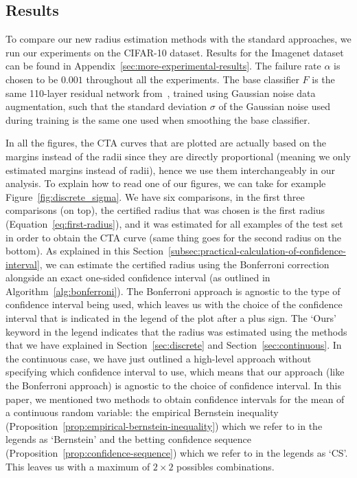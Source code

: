 \subsection{Results}\label{subsec:results}

To compare our new radius estimation methods with the standard approaches, we run our experiments on the CIFAR-10 dataset.
Results for the Imagenet dataset can be found in Appendix~\ref{sec:more-experimental-results}.
The failure rate $\alpha$ is chosen to be $0.001$ throughout all the experiments.
The base classifier $F$ is the same 110-layer residual network from~\citep{cohen2019certified}, trained using Gaussian noise data augmentation, such that the standard deviation $\sigma$ of the Gaussian noise used during training is the same one used when smoothing the base classifier.

In all the figures, the CTA curves that are plotted are actually based on the margins instead of the radii since they are directly proportional (meaning we only estimated margins instead of radii), hence we use them interchangeably in our analysis.
To explain how to read one of our figures, we can take for example Figure~\ref{fig:discrete_sigma}.
We have six comparisons, in the first three comparisons (on top), the certified radius that was chosen is the first radius (Equation~\eqref{eq:first-radius}), and it was estimated for all examples of the test set in order to obtain the CTA curve (same thing goes for the second radius on the bottom).
As explained in this Section~\ref{subsec:practical-calculation-of-confidence-interval}, we can estimate the certified radius using the Bonferroni correction alongside an exact one-sided confidence interval (as outlined in Algorithm~\ref{alg:bonferroni}).
The Bonferroni approach is agnostic to the type of confidence interval being used, which leaves us with the choice of the confidence interval that is indicated in the legend of the plot after a plus sign.
The `Ours' keyword in the legend indicates that the radius was estimated using the methods that we have explained in Section~\ref{sec:discrete} and Section~\ref{sec:continuous}.
In the continuous case, we have just outlined a high-level approach without specifying which confidence interval to use, which means that our approach (like the Bonferroni approach) is agnostic to the choice of confidence interval.
In this paper, we mentioned two methods to obtain confidence intervals for the mean of a continuous random variable: the empirical Bernstein inequality (Proposition~\ref{prop:empirical-bernstein-inequality}) which we refer to in the legends as `Bernstein' and the betting confidence sequence (Proposition~\ref{prop:confidence-sequence}) which we refer to in the legends as `CS'.
This leaves us with a maximum of $2\times2$ possibles combinations.

